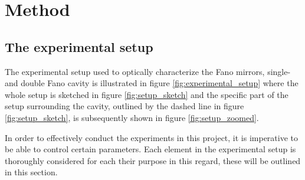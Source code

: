 \section{Method}
\subsection{The experimental setup}

The experimental setup used to optically characterize the Fano mirrors, single- and double Fano cavity is illustrated in figure \ref{fig:experimental_setup} where the whole setup is sketched in figure \ref{fig:setup_sketch} and the specific part of the setup surrounding the cavity, outlined by the dashed line in figure \ref{fig:setup_sketch}, is subsequently shown in figure \ref{fig:setup_zoomed}. 

In order to effectively conduct the experiments in this project, it is imperative to be able to control certain parameters. Each element in the experimental setup is thoroughly considered for each their purpose in this regard, these will be outlined in this section. 

